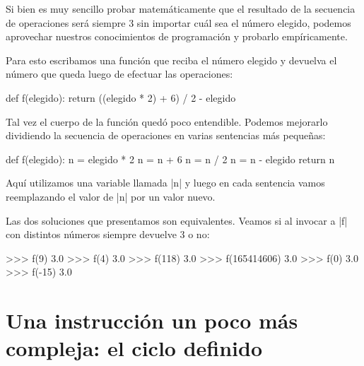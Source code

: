 \begin{solucion}
Si bien es muy sencillo probar matemáticamente que el resultado de la secuencia
de operaciones será siempre 3 sin importar cuál sea el número elegido, podemos
aprovechar nuestros conocimientos de programación y probarlo empíricamente.

Para esto escribamos una función que reciba el número elegido y devuelva el
número que queda luego de efectuar las operaciones:

\begin{codigo-python-sn}
def f(elegido):
    return ((elegido * 2) + 6) / 2 - elegido
\end{codigo-python-sn}

Tal vez el cuerpo de la función quedó poco entendible. Podemos mejorarlo
dividiendo la secuencia de operaciones en varias sentencias más pequeñas:

\begin{codigo-python-sn}
def f(elegido):
	n = elegido * 2
	n = n + 6
	n = n / 2
	n = n - elegido
	return n
\end{codigo-python-sn}

Aquí utilizamos una variable llamada |n| y luego en cada sentencia vamos
reemplazando el valor de |n| por un valor nuevo.

Las dos soluciones que presentamos son equivalentes. Veamos si al invocar a |f|
con distintos números siempre devuelve 3 o no:

\begin{codigo-python-sn}
>>> f(9)
3.0
>>> f(4)
3.0
>>> f(118)
3.0
>>> f(165414606)
3.0
>>> f(0)
3.0
>>> f(-15)
3.0
\end{codigo-python-sn}
\end{solucion}

\section{Una instrucción un poco más compleja: el ciclo definido}

